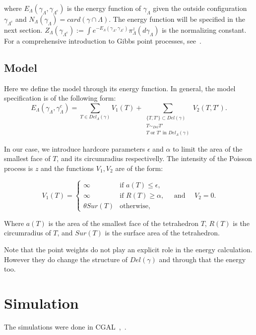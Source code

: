 \documentclass[12pt,a4paper]{report}
\begin{document}
where $E_\Lambda(\gamma_\Lambda, \gamma_{\Lambda^c})$ is the energy function of $\gamma_\Lambda$ given the outside configuration $\gamma_{\Lambda^c}$ and $N_\Lambda(\gamma_\Lambda) = card(\gamma \cap \Lambda)$. The energy function will be specified in the next section. $Z_\Lambda(\gamma_{\Lambda^c}) := \int e^{-E_\Lambda(\gamma_\Lambda, \gamma_{\Lambda^c})} \pi^z_\Lambda(d\gamma_\Lambda)$ is the normalizing constant.
For a comprehensive introduction to Gibbs point processes, see~\cite{dereudre2017}.

\subsection{Model}
Here we define the model through its energy function. In general, the model specification is of the following form:
$$E_\Lambda(\gamma_\Lambda, \gamma_\Lambda^c)= \sum_{T \in Del_\Lambda(\gamma)} V_1(T) + \sum_{\substack{\{T,T'\} \subset Del(\gamma) \\ T\sim_{Del} T' \\ T \text{ or  } T' \text{ in  } Del_\Lambda(\gamma)}} V_2(T,T').$$

In our case, we introduce hardcore parameters $\epsilon$ and $\alpha$ to limit the area of the smallest face of $T$, and its circumradius respectivelly. The intensity of the Poisson process is $z$ and the functions $V_1, V_2$ are of the form:


\begin{equation}\label{model}
V_1(T) = 
\left\{
    \begin{array}{ll}
        \infty & \mbox{if } a(T)\leq \epsilon, \\
        \infty & \mbox{if } R(T)\geq \alpha, \\
        \theta Sur(T) & \mbox{otherwise, }
    \end{array}
\right. \quad \mbox{and } \quad V_2 = 0.
\end{equation}

Where $a(T)$ is the area of the smallest face of the tetrahedron $T$, $R(T)$ is the circumradius of $T$, and $Sur(T)$ is the surface area of the tetrahedron.

Note that the point weights do not play an explicit role in the energy calculation. However they do change the structure of $Del(\gamma)$ and through that the energy too.




\section{Simulation}
The simulations were done in CGAL~\cite{cgal},~\cite{cgal:3d-triang}.
\end{document}
